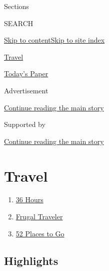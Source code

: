 Sections

SEARCH

\protect\hyperlink{site-content}{Skip to
content}\protect\hyperlink{site-index}{Skip to site index}

\href{https://www.nytimes3xbfgragh.onion/section/travel}{Travel}

\href{https://myaccount.nytimes3xbfgragh.onion/auth/login?response_type=cookie\&client_id=vi}{}

\href{https://www.nytimes3xbfgragh.onion/section/todayspaper}{Today's
Paper}

Advertisement

\protect\hyperlink{after-top}{Continue reading the main story}

Supported by

\protect\hyperlink{after-sponsor}{Continue reading the main story}

\hypertarget{travel}{%
\section{Travel}\label{travel}}

\begin{enumerate}
\def\labelenumi{\arabic{enumi}.}
\tightlist
\item
  \href{/column/36-hours}{36 Hours}
\item
  \href{/column/frugal-traveler}{Frugal Traveler}
\item
  \href{/interactive/2020/travel/places-to-visit.html}{52 Places to Go}
\end{enumerate}

\hypertarget{highlights}{%
\subsection{Highlights}\label{highlights}}

